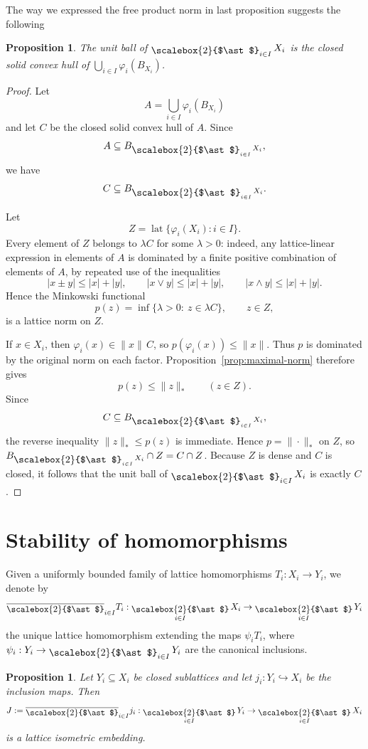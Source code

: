 \documentclass[12pt]{amsart}
\DeclareMathOperator{\lat}{lat}
\DeclareMathOperator*{\bigfree}{\raisebox{-0.6ex}{\scalebox{2}{$\ast$}}}
\theoremstyle{plain}
\newtheorem{proposition}[theorem]{Proposition}
\theoremstyle{definition}
\begin{document}
The way we expressed the free product norm in last proposition suggests the following

\begin{proposition}\label{prop:unit-ball}
The unit ball of $\bigfree_{i\in I}X_i$ is the closed solid convex hull of $\bigcup_{i\in I}\varphi_i(B_{X_i})$.
\end{proposition}

\begin{proof}
Let
\[
A=\bigcup_{i\in I}\varphi_i(B_{X_i})
\]
and let $C$ be the closed solid convex hull of $A$. Since
\[
A\subseteq B_{\bigfree_{i\in I}X_i},
\]
we have
\[
C\subseteq B_{\bigfree_{i\in I}X_i}.
\]

Let
\[
Z=\lat\{\varphi_i(X_i):i\in I\}.
\]
Every element of $Z$ belongs to $\lambda C$ for some $\lambda>0$: indeed, any lattice-linear expression in elements of $A$ is dominated by a finite positive combination of elements of $A$, by repeated use of the inequalities
\[
|x\pm y|\leq |x|+|y|,\qquad |x\vee y|\leq |x|+|y|,\qquad |x\wedge y|\leq |x|+|y|.
\]
Hence the Minkowski functional
\[
p(z)=\inf\{\lambda>0:\ z\in \lambda C\},
\qquad z\in Z,
\]
is a lattice norm on $Z$.

If $x\in X_i$, then $\varphi_i(x)\in \|x\|\,C$, so $p(\varphi_i(x))\leq \|x\|$. Thus $p$ is dominated by the original norm on each factor. Proposition~\ref{prop:maximal-norm} therefore gives
\[
p(z)\leq \|z\|_{\ast}
\qquad (z\in Z).
\]
Since
\[
C\subseteq B_{\bigfree_{i\in I}X_i},
\]
the reverse inequality $\|z\|_{\ast}\leq p(z)$ is immediate. Hence $p=\|\cdot\|_{\ast}$ on $Z$, so $B_{\bigfree_{i\in I}X_i}\cap Z=C\cap Z$. Because $Z$ is dense and $C$ is closed, it follows that the unit ball of $\bigfree_{i\in I}X_i$ is exactly $C$.
\end{proof}

\section{Stability of homomorphisms}\label{sec:homomorphisms}

Given a uniformly bounded family of lattice homomorphisms $T_i:X_i\to Y_i$, we denote by
\[
\overline{\bigfree}_{i\in I}T_i:\bigfree_{i\in I}X_i\to \bigfree_{i\in I}Y_i
\]
the unique lattice homomorphism extending the maps $\psi_iT_i$, where $\psi_i:Y_i\to \bigfree_{i\in I}Y_i$ are the canonical inclusions.

\begin{proposition}\label{prop:embedding-stability}
Let $Y_i\subseteq X_i$ be closed sublattices and let $j_i:Y_i\hookrightarrow X_i$ be the inclusion maps. Then
\[
J:=\overline{\bigfree}_{i\in I}j_i:\bigfree_{i\in I}Y_i\to \bigfree_{i\in I}X_i
\]
is a lattice isometric embedding.
\end{proposition} 
\end{document}
